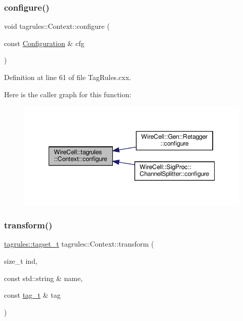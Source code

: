 \subsubsection{\texorpdfstring{configure()}{configure()}}
{\footnotesize\ttfamily void tagrules\+::\+Context\+::configure (\begin{DoxyParamCaption}\item[{const \hyperlink{namespace_wire_cell_a9f705541fc1d46c608b3d32c182333ee}{Configuration} \&}]{cfg }\end{DoxyParamCaption})}



Definition at line 61 of file Tag\+Rules.\+cxx.

Here is the caller graph for this function\+:
\nopagebreak
\begin{figure}[H]
\begin{center}
\leavevmode
\includegraphics[width=348pt]{class_wire_cell_1_1tagrules_1_1_context_a3c7d49c79f0e8f1fb0e583fdfc481b59_icgraph}
\end{center}
\end{figure}
\mbox{\label{class_wire_cell_1_1tagrules_1_1_context_aad708e6ea6a1bf0b9e050559fea62ae1}} 
\subsubsection{\texorpdfstring{transform()}{transform()}\hspace{0.1cm}{\footnotesize\ttfamily [1/2]}}
{\footnotesize\ttfamily \hyperlink{namespace_wire_cell_1_1tagrules_a80263165e3d13e49e317c045829f76cb}{tagrules\+::tagset\+\_\+t} tagrules\+::\+Context\+::transform (\begin{DoxyParamCaption}\item[{size\+\_\+t}]{ind,  }\item[{const std\+::string \&}]{name,  }\item[{const \hyperlink{namespace_wire_cell_1_1tagrules_ae74af6e8edaf0f64b70f6df4e0b66cdc}{tag\+\_\+t} \&}]{tag }\end{DoxyParamCaption})}



